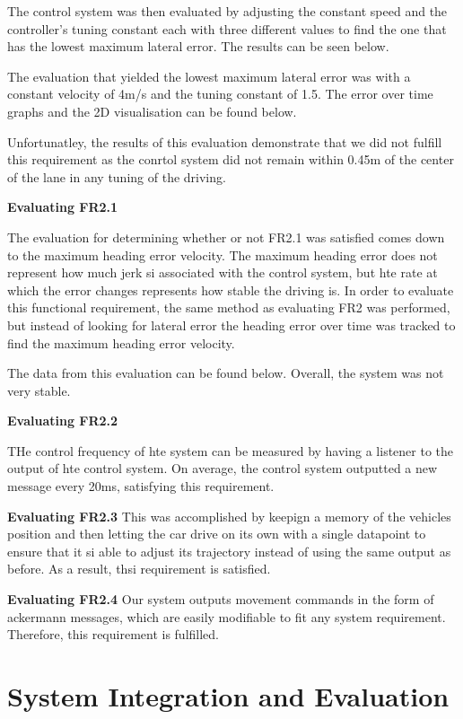 \documentclass[titlepage]{article}
\begin{document}
The control system was then evaluated by adjusting the constant speed and the controller's tuning constant each with three different values to find the one that has the lowest maximum lateral error. The results can be seen below.


The evaluation that yielded the lowest maximum lateral error was with a constant velocity of 4m/s and the tuning constant of 1.5. The error over time graphs and the 2D visualisation can be found below.


Unfortunatley, the results of this evaluation demonstrate that we did not fulfill this requirement as the conrtol system did not remain within 0.45m of the center of the lane in any tuning of the driving.

\textbf{Evaluating FR2.1}

The evaluation for determining whether or not FR2.1 was satisfied comes down to the maximum heading error velocity. The maximum heading error does not represent how much jerk si associated with the control system, but hte rate at which the error changes represents how stable the driving is. In order to evaluate this functional requirement, the same method as evaluating FR2 was performed, but instead of looking for lateral error the heading error over time was tracked to find the maximum heading error velocity.

The data from this evaluation can be found below. Overall, the system was not very stable.

\textbf{Evaluating FR2.2}

THe control frequency of hte system can be measured by having a listener to the output of hte control system. On average, the control system outputted a new message every 20ms, satisfying this requirement.

\textbf{Evaluating FR2.3}
This was accomplished by keepign a memory of the vehicles position and then letting the car drive on its own with a single datapoint to ensure that it si able to adjust its trajectory instead of using the same output as before. As a result, thsi requirement is satisfied.

\textbf{Evaluating FR2.4}
Our system outputs movement commands in the form of ackermann messages, which are easily modifiable to fit any system requirement. Therefore, this requirement is fulfilled.


\section{System Integration and Evaluation}
\end{document}
